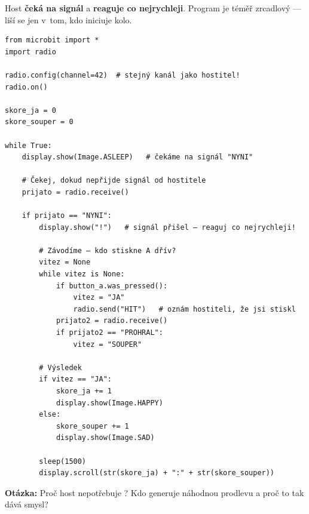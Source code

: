 \begin{ukol}

Host \textbf{čeká na signál} a \textbf{reaguje co nejrychleji}.
Program je téměř zrcadlový — liší se jen v~tom, kdo iniciuje kolo.

\begin{lstlisting}
from microbit import *
import radio

radio.config(channel=42)  # stejný kanál jako hostitel!
radio.on()

skore_ja = 0
skore_souper = 0

while True:
    display.show(Image.ASLEEP)   # čekáme na signál "NYNI"

    # Čekej, dokud nepřijde signál od hostitele
    prijato = radio.receive()

    if prijato == "NYNI":
        display.show("!")   # signál přišel — reaguj co nejrychleji!

        # Závodíme — kdo stiskne A dřív?
        vitez = None
        while vitez is None:
            if button_a.was_pressed():
                vitez = "JA"
                radio.send("HIT")   # oznám hostiteli, že jsi stiskl
            prijato2 = radio.receive()
            if prijato2 == "PROHRAL":
                vitez = "SOUPER"

        # Výsledek
        if vitez == "JA":
            skore_ja += 1
            display.show(Image.HAPPY)
        else:
            skore_souper += 1
            display.show(Image.SAD)

        sleep(1500)
        display.scroll(str(skore_ja) + ":" + str(skore_souper))
\end{lstlisting}

\textbf{Otázka:} Proč host nepotřebuje ?
Kdo generuje náhodnou prodlevu a proč to tak dává smysl?

\odpoved[1.5cm]

\end{ukol}

